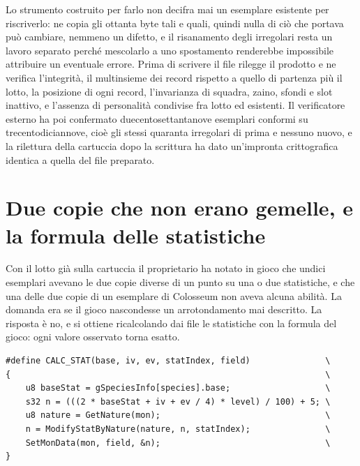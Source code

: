 Lo strumento costruito per farlo non decifra mai un esemplare esistente per riscriverlo: ne copia gli ottanta byte tali e quali, quindi nulla di ciò che portava può cambiare, nemmeno un difetto, e il risanamento degli irregolari resta un lavoro separato perché mescolarlo a uno spostamento renderebbe impossibile attribuire un eventuale errore. Prima di scrivere il file rilegge il prodotto e ne verifica l'integrità, il multinsieme dei record rispetto a quello di partenza più il lotto, la posizione di ogni record, l'invarianza di squadra, zaino, sfondi e slot inattivo, e l'assenza di personalità condivise fra lotto ed esistenti. Il verificatore esterno ha poi confermato duecentosettantanove esemplari conformi su trecentodiciannove, cioè gli stessi quaranta irregolari di prima e nessuno nuovo, e la rilettura della cartuccia dopo la scrittura ha dato un'impronta crittografica identica a quella del file preparato.

\section{Due copie che non erano gemelle, e la formula delle statistiche}

Con il lotto già sulla cartuccia il proprietario ha notato in gioco che undici esemplari avevano le due copie diverse di un punto su una o due statistiche, e che una delle due copie di un esemplare di Colosseum non aveva alcuna abilità. La domanda era se il gioco nascondesse un arrotondamento mai descritto. La risposta è no, e si ottiene ricalcolando dai file le statistiche con la formula del gioco: ogni valore osservato torna esatto.

\begin{lstlisting}[style=c,caption={Da \texttt{src/pokemon.c}, riga 2814: ogni divisione è intera, e la natura moltiplica il risultato già troncato.}]
#define CALC_STAT(base, iv, ev, statIndex, field)               \
{                                                               \
    u8 baseStat = gSpeciesInfo[species].base;                   \
    s32 n = (((2 * baseStat + iv + ev / 4) * level) / 100) + 5; \
    u8 nature = GetNature(mon);                                 \
    n = ModifyStatByNature(nature, n, statIndex);               \
    SetMonData(mon, field, &n);                                 \
}
\end{lstlisting}

